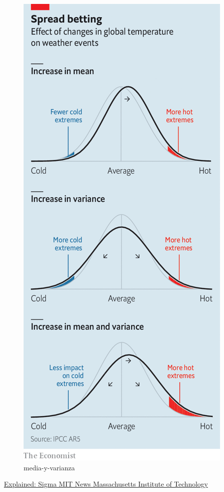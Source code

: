 \documentclass[
  letterpaper,
  DIV=11,
  numbers=noendperiod,
  oneside]{scrreprt}
\begin{document}
\begin{figure}

{\centering \includegraphics{01-imagenes/media-y-varianza.png}

}

\caption{media-y-varianza}

\end{figure}

\href{https://news.mit.edu/2012/explained-sigma-0209}{Explained: Sigma
\textbar{} MIT News \textbar{} Massachusetts Institute of Technology}
\end{document}
